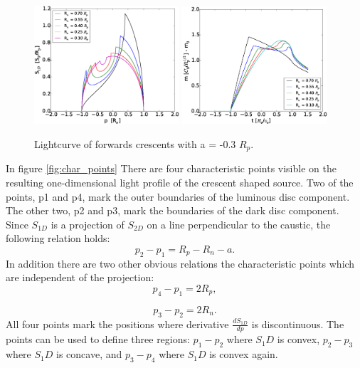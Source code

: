 \documentclass[usenatbib]{mn2e}
\begin{document}
\begin{figure}
\centering
    \includegraphics[width = 0.48\textwidth]{figures/S1D_var_rn_a_neg.eps}
    \includegraphics[width = 0.48\textwidth]{figures/5Rn_forw_var_magnification.eps}
\caption{\label{fig:lightcurve_crescent} Lightcurve of forwards crescents with a = -0.3 $R_p$.}
\end{figure}

In figure \ref{fig:char_points} There are four characteristic points visible on the resulting one-dimensional light profile of the crescent shaped source. Two of the points, p1 and p4, mark the outer boundaries of the luminous disc component. The other two, p2 and p3, mark the boundaries of the dark disc component. Since $S_{1D}$ is a projection of $S_{2D}$ on a line perpendicular to the caustic, the following relation holds:
\begin{equation}
    p_2-p_1 = R_p -R_n - a.
\end{equation}
In addition there are two other obvious relations the characteristic points which are independent of the projection:
\begin{equation}
    p_4 -p_1 = 2 R_p,
\end{equation}

\begin{equation}
        p_3 -p_2 = 2 R_n.
\end{equation}
All four points mark the positions where derivative $\frac{dS_{1D}}{dp}$ is discontinuous. The points can be used to define three regions: $p_1 - p_2$ where $S_1D$ is convex, $p_2 - p_3$ where $S_1D$ is concave, and $p_3 - p_4$ where $S_1D$ is convex again. \\
\end{document}
